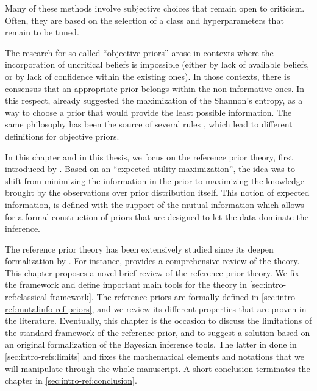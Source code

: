 Many of these  methods involve subjective choices that remain open to criticism. Often, they are based on the selection of a class and hyperparameters that remain to be tuned.

The research for so-called ``objective priors'' arose in contexts where the incorporation of uncritical beliefs is impossible (either by lack of available beliefs, or by lack of confidence within the existing ones).
In those contexts, there is consensus that an appropriate prior belongs within the non-informative ones. In this respect, \citet{lindley_measure_1956} already suggested the maximization of the Shannon's entropy, as a way to choose a prior that would provide the least possible information.
The same philosophy has been the source of several rules \citep{kass_selection_1996, datta_invariance_1996,berger_objective_2008}, which lead to different definitions for objective priors.

In this chapter and in this thesis, we focus on the reference prior theory, first introduced by \citet{bernardo_expected_1979}. 
Based on an ``expected utility maximization'',
the idea was to shift from minimizing the information in the prior to maximizing the knowledge brought by the observations over prior distribution itself.
This notion of expected information, is defined with the support of the mutual information which allows for a formal construction of priors that are designed to let the data dominate the inference.

The reference prior theory has been extensively studied since its deepen formalization by \citet{berger_formal_2009}. For instance, \citet{mure_objective_2018} provides a comprehensive review of the theory.
This chapter proposes a novel brief review of the reference prior theory. We fix the framework and define important main tools for the theory in \cref{sec:intro-ref:classical-framework}. %
The reference priors are formally defined in \cref{sec:intro-ref:mutalinfo-ref-priors}, and we review its different properties that are proven in the literature.
Eventually, this chapter is the occasion to discuss the limitations of the standard framework of the reference prior, and to suggest a solution based on an original formalization of the Bayesian inference tools.  The latter in done in \cref{sec:intro-refs:limits} and fixes the mathematical elements and notations that we will manipulate through the whole manuscript. A short conclusion terminates the chapter in \cref{sec:intro-ref:conclusion}.






